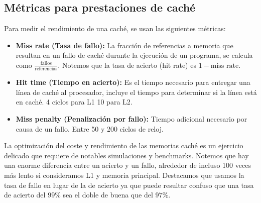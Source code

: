 \subsection{Métricas para prestaciones de caché}
Para medir el rendimiento de una caché, se usan las siguientes métricas:
\begin{itemize}
    \item \textbf{Miss rate (Tasa de fallo):} La fracción de referencias a memoria que resultan en un fallo de caché durante la ejecución
        de un programa, se calcula como $\frac{\text{fallos}}{\text{referencias}}$. Notemos que la tasa de acierto (hit rate) es $1 - \text{miss rate}$.
    \item \textbf{Hit time (Tiempo en acierto):} Es el tiempo necesario para entregar una línea de caché al procesador, incluye el tiempo
        para determinar si la línea está en caché. 4 ciclos para L1 10 para L2.
    \item \textbf{Miss penalty (Penalización por fallo):} Tiempo adicional necesario por causa de un fallo. Entre 50 y 200 ciclos de reloj.
\end{itemize}
La optimización del coste y rendimiento de las memorias caché es un ejercicio delicado que requiere de notables simulaciones y benchmarks.
Notemos que hay una enorme diferencia entre un acierto y un fallo, alrededor de incluso 100 veces más lento si consideramos L1 y memoria principal. Destacamos
que usamos la tasa de fallo en lugar de la de acierto ya que puede resultar confuso que una tasa de acierto del $99\%$ sea el doble de buena que del $97\%$.
